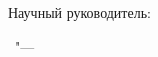 %
\vspace{0pt plus4fill} %
\begin{flushright}%
Научный руководитель:

\supervisorRegalia

\supervisorFio
\end{flushright}%
%
\vspace{0pt plus4fill} %
\begin{center}%
{\thesisCity\ "--- \thesisYear}
\end{center}%
\newpage
